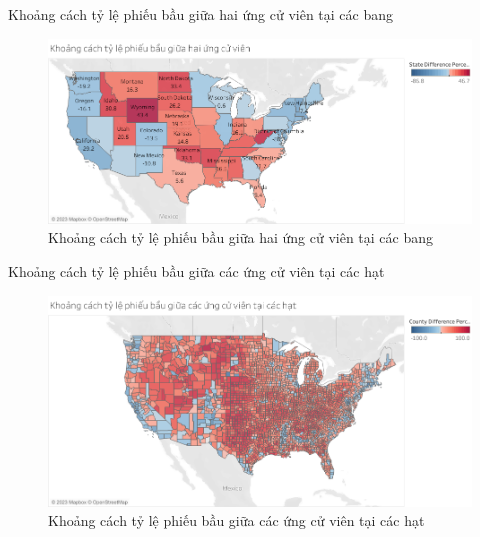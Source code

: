 \documentclass[10pt]{beamer}
\theoremstyle{remark}
\theoremstyle{definition}
\begin{document}
\begin{frame}{Khoảng cách tỷ lệ phiếu bầu giữa hai ứng cử viên tại các bang}
	\begin{figure}[h!]
        \centering
        \includegraphics[width=\textwidth]{figures/State_Difference_Percentage_Total_Vote_Two_Candidate.png}
        \caption{Khoảng cách tỷ lệ phiếu bầu giữa hai ứng cử viên tại các bang}
    \end{figure}
\end{frame}

\begin{frame}{Khoảng cách tỷ lệ phiếu bầu giữa các ứng cử viên tại các hạt}
	\begin{figure}[h!]
        \centering
        \includegraphics[width=\textwidth]{figures/County_Difference_Percentage_Total_Vote_Two_Candidate.png}
        \caption{Khoảng cách tỷ lệ phiếu bầu giữa các ứng cử viên tại các hạt}
    \end{figure}
\end{frame}
\end{document}
